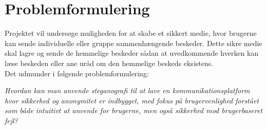 \section{Problemformulering}
Projektet vil undersøge muligheden for at skabe et sikkert medie, hvor brugerne kan sende individuelle eller gruppe sammenhængende beskeder. Dette sikre medie skal lagre og sende de hemmelige beskeder sådan at uvedkommende hverken kan læse beskeden eller ane uråd om den hemmelige beskeds eksistens. 
\\Det udmunder i følgende problemformulering:
\begin{mdframed}[linewidth=0pt,backgroundcolor=lightgray!20,innertopmargin = 0.4cm,innerbottommargin = 0.4cm]
    \textit{Hvordan kan man anvende steganografi til at lave en kommunikationsplatform hvor sikkerhed og anonymitet er indbygget, med fokus på brugervenlighed forstået som både intuitivt at anvende for brugerne, men også sikkerhed mod brugerbaseret fejl?}
\end{mdframed}




